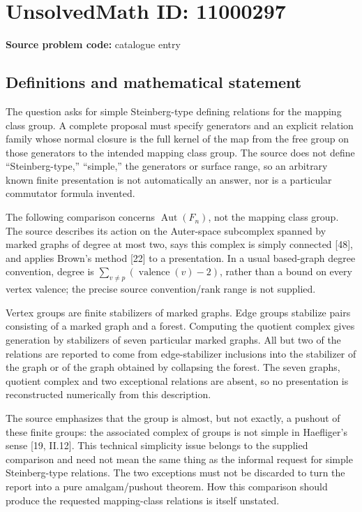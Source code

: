 \documentclass[11pt]{article}
\begin{document}
\section*{UnsolvedMath ID: 11000297}
\textbf{Source problem code:} catalogue entry
\subsection{Definitions and mathematical statement}
The question asks for simple Steinberg-type defining relations for the mapping class group. A complete proposal must specify generators and an explicit relation family whose normal closure is the full kernel of the map from the free group on those generators to the intended mapping class group. The source does not define ``Steinberg-type,'' ``simple,'' the generators or surface range, so an arbitrary known finite presentation is not automatically an answer, nor is a particular commutator formula invented.

The following comparison concerns \(\operatorname{Aut}(F_n)\), not the mapping class group. The source describes its action on the Auter-space subcomplex spanned by marked graphs of degree at most two, says this complex is simply connected [48], and applies Brown's method [22] to a presentation. In a usual based-graph degree convention, degree is \(\sum_{v\ne p}(\operatorname{valence}(v)-2)\), rather than a bound on every vertex valence; the precise source convention/rank range is not supplied.

Vertex groups are finite stabilizers of marked graphs. Edge groups stabilize pairs consisting of a marked graph and a forest. Computing the quotient complex gives generation by stabilizers of seven particular marked graphs. All but two of the relations are reported to come from edge-stabilizer inclusions into the stabilizer of the graph or of the graph obtained by collapsing the forest. The seven graphs, quotient complex and two exceptional relations are absent, so no presentation is reconstructed numerically from this description.

The source emphasizes that the group is almost, but not exactly, a pushout of these finite groups: the associated complex of groups is not simple in Haefliger's sense [19, II.12]. This technical simplicity issue belongs to the supplied comparison and need not mean the same thing as the informal request for simple Steinberg-type relations. The two exceptions must not be discarded to turn the report into a pure amalgam/pushout theorem. How this comparison should produce the requested mapping-class relations is itself unstated.
\end{document}
